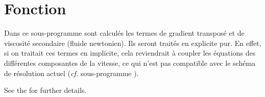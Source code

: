 
%
%
%
%


%

\hypertarget{visecv}{}

\vspace{1cm}
\section*{Fonction}
Dans ce sous-programme sont calculés les termes de gradient transposé et de viscosité
secondaire (fluide newtonien). Ils seront traités en explicite
pur. En effet, si on traitait ces termes en implicite, cela reviendrait
à coupler les équations des différentes composantes de la vitesse, ce qui n'est
pas compatible avec le schéma de résolution actuel ({\it cf. } sous-programme ).

See the  for further details.

